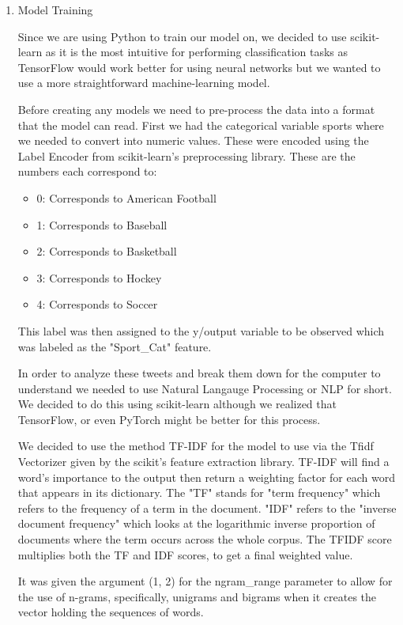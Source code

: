 \documentclass{article}
\begin{document}
\begin{enumerate}
\begin{itemize}
    \end{itemize}
    
    \item Model Training

    Since we are using Python to train our model on, we decided to use scikit-learn as it is the most intuitive for performing classification tasks as TensorFlow would work better for using neural networks but we wanted to use a more straightforward machine-learning model.
    
    Before creating any models we need to pre-process the data into a format that the model can read. First we had the categorical variable sports where we needed to convert into numeric values. These were encoded using the Label Encoder from scikit-learn's preprocessing library. 
    These are the numbers each correspond to:
    \begin{itemize}
    \item 0: Corresponds to American Football
    \item 1: Corresponds to Baseball
    \item 2: Corresponds to Basketball
    \item 3: Corresponds to Hockey
    \item 4: Corresponds to Soccer
    \end{itemize}

    This label was then assigned to the y/output variable to be observed which was labeled as the "Sport\_Cat" feature.

    In order to analyze these tweets and break them down for the computer to understand we needed to use Natural Langauge Processing or NLP for short.
    We decided to do this using scikit-learn although we realized that TensorFlow, or even PyTorch might be better for this process.

    We decided to use the method TF-IDF for the model to use via the Tfidf Vectorizer given by the scikit's feature extraction library. TF-IDF will find a word's importance to the output then return a weighting factor for each word that appears in its dictionary.
    The "TF" stands for "term frequency" which refers to the frequency of a term in the document. "IDF" refers to the "inverse document frequency" which looks at the logarithmic inverse proportion of documents where the term occurs across the whole corpus. The TFIDF score multiplies both the TF and IDF scores, to get a final weighted value.
    
    It was given the argument (1, 2) for the ngram\_range parameter to allow for the use of n-grams, specifically, unigrams and bigrams when it creates the vector holding the sequences of words.


\end{enumerate}
\end{document}
